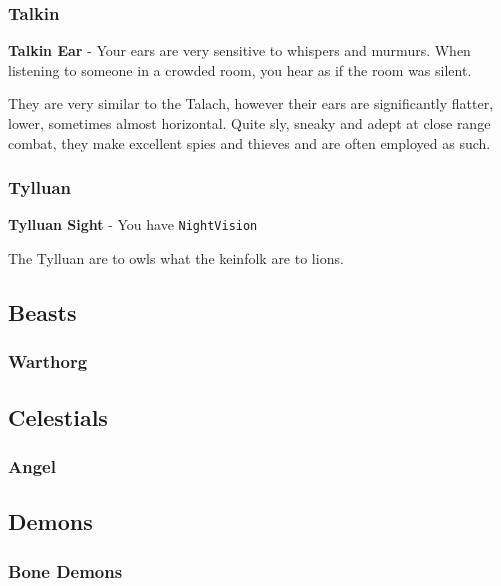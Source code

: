 \hypertarget{talkin}{%
\subsubsection{Talkin}\label{talkin}}

\textbf{Talkin Ear} - Your ears are very sensitive to whispers and
murmurs. When listening to someone in a crowded room, you hear as if the
room was silent.

They are very similar to the Talach, however their ears are
significantly flatter, lower, sometimes almost horizontal. Quite sly,
sneaky and adept at close range combat, they make excellent spies and
thieves and are often employed as such.

\hypertarget{tylluan}{%
\subsubsection{Tylluan}\label{tylluan}}

\textbf{Tylluan Sight} - You have \texttt{NightVision}

The Tylluan are to owls what the keinfolk are to lions.

\hypertarget{beasts}{%
\subsection{Beasts}\label{beasts}}

\hypertarget{warthorg}{%
\subsubsection{Warthorg}\label{warthorg}}

\hypertarget{celestials}{%
\subsection{Celestials}\label{celestials}}

\hypertarget{angel}{%
\subsubsection{Angel}\label{angel}}

\hypertarget{demons}{%
\subsection{Demons}\label{demons}}

\hypertarget{bone-demons}{%
\subsubsection{Bone Demons}\label{bone-demons}}

